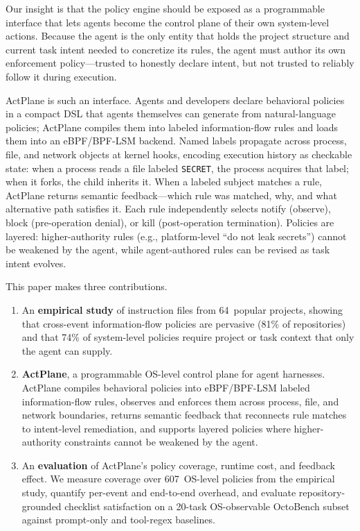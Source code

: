 Our insight is that the policy engine should be exposed as a
programmable interface that lets agents become the control plane of
their own system-level actions. Because the agent is the only entity
that holds the project structure and current task intent needed to
concretize its rules, the agent must author its own enforcement
policy---trusted to honestly declare intent, but not trusted to
reliably follow it during execution.

ActPlane is such an interface. Agents and developers declare behavioral
policies in a compact DSL that agents themselves can generate from
natural-language policies; ActPlane compiles them into labeled
information-flow rules and loads them into an eBPF/BPF-LSM backend. Named
labels propagate across process, file, and network objects at kernel hooks,
encoding execution history as checkable state: when a process reads a file
labeled \texttt{SECRET}, the process acquires that label; when it forks, the
child inherits it. When a labeled subject matches a rule, ActPlane returns
semantic feedback---which rule was matched, why, and what alternative path
satisfies it. Each rule independently selects notify (observe), block
(pre-operation denial), or kill (post-operation termination).
Policies are layered: higher-authority rules (e.g., platform-level
``do not leak secrets'') cannot be weakened by the agent, while
agent-authored rules can be revised as task intent evolves.

This paper makes three contributions.

\begin{enumerate}
\item An \textbf{empirical study} of instruction files from 64~popular
projects, showing that cross-event information-flow policies are pervasive
(81\% of repositories) and that 74\% of system-level policies require
project or task context that only the agent can supply.

\item \textbf{ActPlane}, a programmable OS-level control plane for agent
harnesses. ActPlane compiles behavioral policies into eBPF/BPF-LSM labeled
information-flow rules, observes and enforces them across process, file,
and network boundaries, returns semantic feedback that reconnects rule
matches to intent-level remediation, and supports layered policies where
higher-authority constraints cannot be weakened by the agent.

\item An \textbf{evaluation} of ActPlane's policy coverage, runtime
cost, and feedback effect. We measure coverage over 607~OS-level
policies from the empirical study, quantify per-event and end-to-end
overhead, and evaluate repository-grounded checklist satisfaction on a
20-task OS-observable OctoBench subset against prompt-only and tool-regex
baselines.
\end{enumerate}
